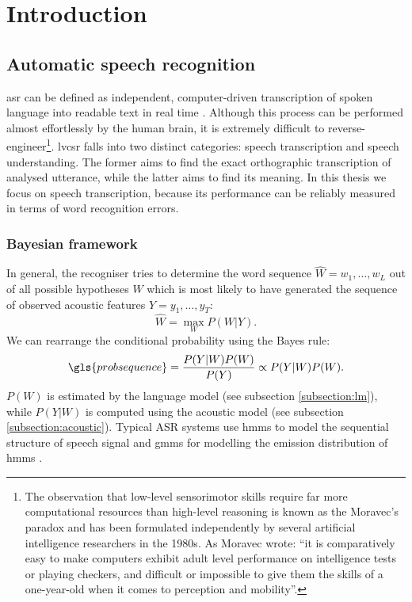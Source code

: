 \chapter{Introduction}
\label{chapter:intro}

\section{Automatic speech recognition}
\label{section:asr}
\Gls{asr} can be defined as independent, computer-driven transcription of spoken language into readable text in real time \cite{stuckless1994developments, jelinek1997statistical}. Although this process can be performed almost effortlessly by the human brain, it is extremely difficult to reverse-engineer\footnote{The observation that low-level sensorimotor skills require far more computational resources than high-level reasoning is known as the Moravec's paradox and has been formulated independently by several artificial intelligence researchers in the 1980s. As Moravec wrote: ``it is comparatively easy to make computers exhibit adult level performance on intelligence tests or playing checkers, and difficult or impossible to give them the skills of a one-year-old when it comes to perception and mobility''\cite{moravec1988mind}.}. \Gls{lvcsr} falls into two distinct categories: speech transcription and speech understanding. The former aims to find the exact orthographic transcription of analysed utterance, while the latter aims to find its meaning. In this thesis we focus on speech transcription, because its performance can be reliably measured in terms of word recognition errors.

\subsection{Bayesian framework}
In general, the recogniser tries to determine the word sequence $\hat{W}=w_{1}, \ldots, w_{L}$ out of all possible hypotheses $W$ which is most likely to have generated the sequence of observed acoustic features $Y=y_{1}, \ldots, y_{T}$:
\begin{equation}
\label{equation:recogniser}
  \hat{W}=\max_{W}P(W|Y).
\end{equation}
We can rearrange the conditional probability using the Bayes rule:
\begin{equation}
  \label{equation:bayesian}
  \gls{probsequence}=\frac{P(Y|W)P(W)}{P(Y)}\propto{P(Y|W)P(W)}.
\end{equation}
$P(W)$ is estimated by the language model (see subsection \ref{subsection:lm}), while $P(Y|W)$ is computed using the acoustic model (see subsection \ref{subsection:acoustic}). Typical ASR systems use \glspl{hmm} to model the sequential structure of speech signal and \glspl{gmm} for modelling the emission distribution of \glspl{hmm} \cite{baker1975dragon, bourlard1994connectionist}.

